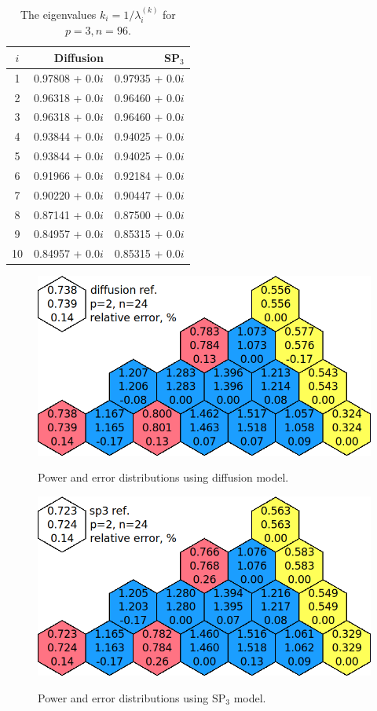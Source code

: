 \documentclass[authoryear]{elsarticle}
\begin{document}
\begin{table}[h]
\caption{The eigenvalues $k_i=1/\lambda_i^{(k)}$ for $p=3, n=96$.}
\label{tab:iaea_without_lambda_10}
\begin{center}
\begin{tabular}{c r r}
\hline
$i$ & Diffusion & SP$_3$  \\
\hline
1 & 0.97808 + 0.0$i$ & 0.97935 + 0.0$i$\\
2 & 0.96318 + 0.0$i$ & 0.96460 + 0.0$i$\\
3 & 0.96318 + 0.0$i$ & 0.96460 + 0.0$i$\\
4 & 0.93844 + 0.0$i$ & 0.94025 + 0.0$i$\\
5 & 0.93844 + 0.0$i$ & 0.94025 + 0.0$i$\\
6 & 0.91966 + 0.0$i$ & 0.92184 + 0.0$i$\\
7 & 0.90220 + 0.0$i$ & 0.90447 + 0.0$i$\\
8 & 0.87141 + 0.0$i$ & 0.87500 + 0.0$i$\\
9 & 0.84957 + 0.0$i$ & 0.85315 + 0.0$i$\\
10 & 0.84957 + 0.0$i$ & 0.85315 + 0.0$i$\\
\hline
\end{tabular}
\end{center}
\end{table}

\begin{figure}[h]
\begin{center}
	\includegraphics[width=0.75\linewidth]{diff_without_p2n24.png}\\
	\caption{Power and error distributions using diffusion model.}
	\label{fig:power_iaea_without_dif}
\end{center}
\end{figure}
\begin{figure}[h]
\begin{center}
	\includegraphics[width=0.75\linewidth]{sp3_without_p2n24.png}\\
	\caption{Power and error distributions using $\mathrm{SP_3}$ model.}
	\label{fig:power_ieae_without_sp3}
\end{center}
\end{figure}
\end{document}
